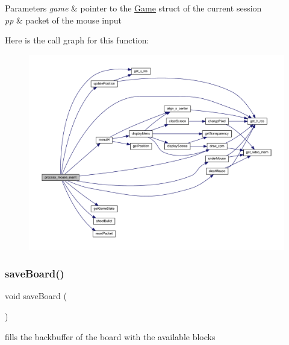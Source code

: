 \begin{DoxyParams}{Parameters}
{\em game} & pointer to the \mbox{\hyperlink{struct_game}{Game}} struct of the current session \\
\hline
{\em pp} & packet of the mouse input \\
\hline
\end{DoxyParams}
Here is the call graph for this function\+:
\nopagebreak
\begin{figure}[H]
\begin{center}
\leavevmode
\includegraphics[width=350pt]{group__game_gad54324212d792e38302b19e409a413ae_cgraph}
\end{center}
\end{figure}
\mbox{\label{group__game_ga0cf89070294bbf27c335ebf047e0f1f6}} 
\subsubsection{\texorpdfstring{saveBoard()}{saveBoard()}}
{\footnotesize\ttfamily void save\+Board (\begin{DoxyParamCaption}{ }\end{DoxyParamCaption})}



fills the backbuffer of the board with the available blocks 

